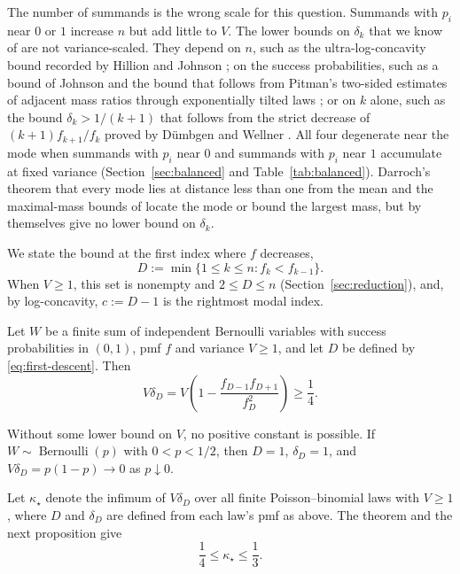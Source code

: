 \documentclass[ECP]{ejpecp}
\newcommand{\Ber}{\operatorname{Bernoulli}}
\begin{document}
The number of summands is the wrong scale for this question. Summands with
$p_i$ near $0$ or $1$ increase $n$ but add little to $V$. The lower bounds on
$\delta_k$ that we know of are not variance-scaled. They depend on $n$, such
as the ultra-log-concavity bound recorded by Hillion and Johnson
\cite{hillionjohnson2016}; on the success probabilities, such as a bound of
Johnson \cite{johnson2017discrete} and the bound that follows from Pitman's
two-sided estimates of adjacent mass ratios through exponentially tilted laws
\cite[equation~(20)]{pitman1997}; or on $k$ alone, such as the bound
$\delta_k>1/(k+1)$ that follows from the strict decrease of
$(k+1)f_{k+1}/f_k$ proved by D\"umbgen and Wellner
\cite[Proposition~2]{duembgenwellner2020}. All four degenerate near the mode when
summands with $p_i$ near $0$ and summands with $p_i$ near $1$ accumulate at
fixed variance (Section~\ref{sec:balanced} and Table~\ref{tab:balanced}).
Darroch's theorem that every mode lies at distance less than one from the
mean \cite[Theorem~4]{darroch1964} and the maximal-mass bounds of
\cite{bailloncominettivaisman2016,bobkovmarsigliettimelbourne2022} locate the
mode or bound the largest mass, but by themselves give no lower bound on
$\delta_k$.

We state the bound at the first index where $f$ decreases,
\begin{equation}\label{eq:first-descent}
  D:=\min\{1\leq k\leq n:f_k<f_{k-1}\}.
\end{equation}
When $V\geq1$, this set is nonempty and $2\leq D\leq n$
(Section~\ref{sec:reduction}), and, by log-concavity, $c:=D-1$ is the
rightmost modal index.

\begin{theorem}\label{thm:main}
  Let $W$ be a finite sum of independent Bernoulli variables with success
  probabilities in $(0,1)$, pmf $f$ and variance $V\geq1$, and let $D$ be
  defined by \eqref{eq:first-descent}. Then
  \begin{equation}\label{eq:main-bound}
    V\delta_D
    =V\left(1-\frac{f_{D-1}f_{D+1}}{f_D^2}\right)
    \geq\frac14.
  \end{equation}
\end{theorem}

Without some lower bound on $V$, no positive constant is possible. If $W\sim\Ber(p)$ with $0<p<1/2$, then $D=1$, $\delta_D=1$, and
$V\delta_D=p(1-p)\to0$ as $p\downarrow0$.

Let $\kappa_\star$ denote the infimum of $V\delta_D$ over all finite
Poisson--binomial laws with $V\geq1$, where $D$ and $\delta_D$ are defined
from each law's pmf as above. The theorem and the next proposition give
\begin{equation}\label{eq:constant-bracket}
  \frac14\leq\kappa_\star\leq\frac13.
\end{equation}
\end{document}
